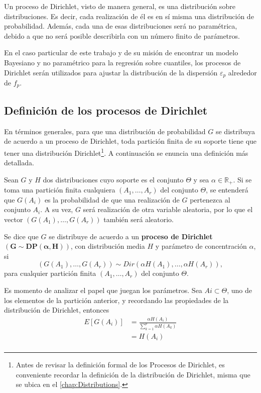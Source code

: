 Un proceso de Dirichlet, visto de manera general, es una distribuci\'on sobre distribuciones. Es decir, cada realizaci\'on de él es en sí misma una distribuci\'on de probabilidad. Adem\'as, cada una de esas distribuciones ser\'a no param\'etrica, debido a que no ser\'a posible describirla con un n\'umero finito de par\'ametros.

En el caso particular de este trabajo y de su misi\'on de encontrar un modelo Bayesiano y no param\'etrico para la regresi\'on sobre cuantiles, los procesos de Dirichlet ser\'an utilizados para ajustar la distribuci\'on de la dispersi\'on $\varepsilon_p$ alrededor de $f_p$.

\subsection{Definici\'on de los procesos de Dirichlet}

En t\'erminos generales, para que una distribuci\'on de probabilidad $G$ se distribuya de acuerdo a un proceso de Dirichlet, toda partici\'on finita de su soporte tiene que tener una distribuci\'on Dirichlet\footnote{Antes de revisar la definici\'on formal de los Procesos de Dirichlet, es conveniente recordar la definici\'on de la distribuci\'on de Dirichlet, misma que se ubica en el \autoref{chap:Distributions}.}. A continuaci\'on se enuncia una definici\'on m\'as detallada.

\begin{defin}
    Sean $G$ y $H$ dos distribuciones cuyo soporte es el conjunto $\Theta$ y sea $\alpha \in \mathbb{R}_+$. Si se toma una partici\'on finita cualquiera $(A_1,\ldots,A_r)$ del conjunto $\Theta$, se entender\'a que $G(A_i)$ es la probabilidad de que una realizaci\'on de $G$ pertenezca al conjunto $A_i$.
    A su vez, $G$ ser\'a realizaci\'on de otra variable aleatoria, por lo que el vector $(G(A_1),\ldots,G(A_r))$ tambi\'en ser\'a aleatorio.
    
    Se dice que $G$ se distribuye de acuerdo a un \textbf{proceso de Dirichlet} $\bm{(G \sim DP(\alpha,H))}$, con distribuci\'on media $H$ y par\'ametro de concentraci\'on $\alpha$, si
    \begin{equation*}
        (G(A_1),\ldots,G(A_r)) \sim Dir(\alpha H(A_1),\ldots,\alpha H(A_r)), 
    \end{equation*}
    para cualquier partici\'on finita $(A_1,\ldots,A_r)$ del conjunto $\Theta$.
\end{defin}

Es momento de analizar el papel que juegan los par\'ametros. Sea $Ai \subset \Theta$, uno de los elementos de la partici\'on anterior, y recordando las propiedades de la distribuci\'on de Dirichlet, entonces
\begin{equation*}
\begin{aligned}
    E[G(A_i)] 
    &= \frac{\alpha H(A_i)}{\sum_{k=1}^p \alpha H(A_k)} \\
    &= H(A_i) \\
\end{aligned}
\end{equation*}

